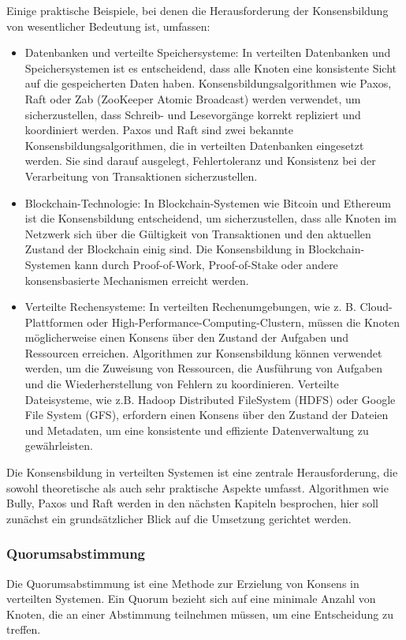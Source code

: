 Einige praktische Beispiele, bei denen die Herausforderung der Konsensbildung von wesentlicher Bedeutung ist, umfassen:
\begin{itemize}
\item Datenbanken und verteilte Speichersysteme: In verteilten Datenbanken und Speichersystemen ist es entscheidend, dass alle Knoten eine konsistente Sicht auf die gespeicherten Daten haben. Konsensbildungsalgorithmen wie Paxos, Raft oder Zab (ZooKeeper Atomic Broadcast) werden verwendet, um sicherzustellen, dass Schreib- und Lesevorgänge korrekt repliziert und koordiniert werden. 
Paxos und Raft sind zwei bekannte Konsensbildungsalgorithmen, die in verteilten Datenbanken eingesetzt werden. Sie sind darauf ausgelegt, Fehlertoleranz und Konsistenz bei der Verarbeitung von Transaktionen sicherzustellen.

\item Blockchain-Technologie: In Blockchain-Systemen wie Bitcoin und Ethereum ist die Konsensbildung entscheidend, um sicherzustellen, dass alle Knoten im Netzwerk sich über die Gültigkeit von Transaktionen und den aktuellen Zustand der Blockchain einig sind. Die Konsensbildung in Blockchain-Systemen kann durch Proof-of-Work, Proof-of-Stake oder andere konsensbasierte Mechanismen erreicht werden.

\item Verteilte Rechensysteme: In verteilten Rechenumgebungen, wie z. B. Cloud-Plattformen oder High-Performance-Computing-Clustern, müssen die Knoten möglicherweise einen Konsens über den Zustand der Aufgaben und Ressourcen erreichen. Algorithmen zur Konsensbildung können verwendet werden, um die Zuweisung von Ressourcen, die Ausführung von Aufgaben und die Wiederherstellung von Fehlern zu koordinieren. Verteilte Dateisysteme, wie z.B. Hadoop Distributed FileSystem (HDFS) oder Google File System (GFS), erfordern einen Konsens über den Zustand der Dateien und Metadaten, um eine konsistente und effiziente Datenverwaltung zu gewährleisten.
\end{itemize}
Die Konsensbildung in verteilten Systemen ist eine zentrale Herausforderung, die sowohl theoretische als auch sehr praktische Aspekte umfasst. Algorithmen wie Bully, Paxos und Raft werden in den nächsten Kapiteln besprochen, hier soll zunächst ein grundsätzlicher Blick auf die Umsetzung gerichtet werden.

\subsubsection{Quorumsabstimmung}
Die Quorumsabstimmung ist eine Methode zur Erzielung von Konsens in verteilten Systemen. Ein Quorum bezieht sich auf eine minimale Anzahl von Knoten, die an einer Abstimmung teilnehmen müssen, um eine Entscheidung zu treffen.

